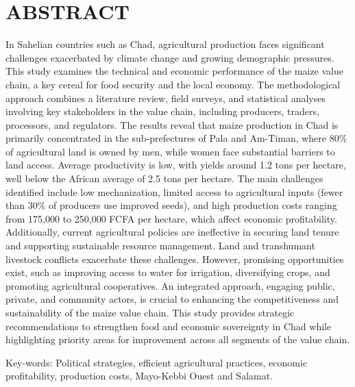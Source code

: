 \documentclass[12pt,oneside]{report}
\begin{document}
\chapter{ABSTRACT}
In Sahelian countries such as Chad, agricultural production faces significant challenges exacerbated by climate change and growing demographic pressures. This study examines the technical and economic performance of the maize value chain, a key cereal for food security and the local economy. The methodological approach combines a literature review, field surveys, and statistical analyses involving key stakeholders in the value chain, including producers, traders, processors, and regulators. The results reveal that maize production in Chad is primarily concentrated in the sub-prefectures of Pala and Am-Timan, where 80\% of agricultural land is owned by men, while women face substantial barriers to land access. Average productivity is low, with yields around 1.2 tons per hectare, well below the African average of 2.5 tons per hectare. The main challenges identified include low mechanization, limited access to agricultural inputs (fewer than 30\% of producers use improved seeds), and high production costs ranging from 175,000 to 250,000 FCFA per hectare, which affect economic profitability. Additionally, current agricultural policies are ineffective in securing land tenure and supporting sustainable resource management. Land and transhumant livestock conflicts exacerbate these challenges. However, promising opportunities exist, such as improving access to water for irrigation, diversifying crops, and promoting agricultural cooperatives. An integrated approach, engaging public, private, and community actors, is crucial to enhancing the competitiveness and sustainability of the maize value chain. This study provides strategic recommendations to strengthen food and economic sovereignty in Chad while highlighting priority areas for improvement across all segments of the value chain.

Key-words: Political strategies, efficient agricultural practices, economic profitability, production costs, Mayo-Kebbi Ouest and Salamat.
\end{document}

